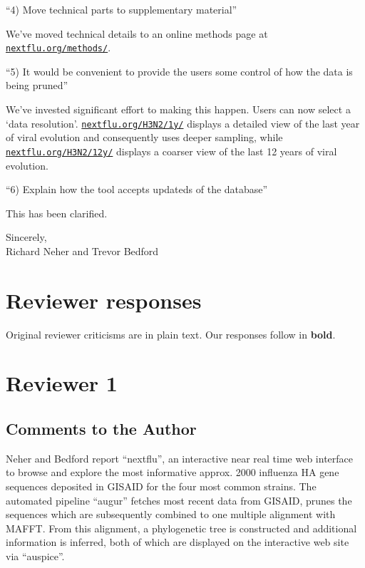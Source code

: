 \documentclass[11pt,oneside,letterpaper]{article}
\begin{document}
``4) Move technical parts to supplementary material''

We've moved technical details to an online methods page at \href{http://nextflu.org/methods/}{\texttt{nextflu.org/methods/}}.

``5) It would be convenient to provide the users some control of how the data is being pruned''

We've invested significant effort to making this happen. Users can now select a `data resolution'. \href{http://nextflu.org/H3N2/1y/}{\texttt{nextflu.org/H3N2/1y/}} displays a detailed view of the last year of viral evolution and consequently uses deeper sampling, while \href{http://nextflu.org/H3N2/12y/}{\texttt{nextflu.org/H3N2/12y/}} displays a coarser view of the last 12 years of viral evolution.

``6) Explain how the tool accepts updateds of the database''

This has been clarified.

Sincerely,\\
Richard Neher and Trevor Bedford

\restoregeometry

\newpage

\section*{Reviewer responses}

Original reviewer criticisms are in plain text.  Our responses follow in \textbf{bold}.  


\section*{Reviewer 1}

\subsection*{Comments to the Author}

Neher and Bedford report ``nextflu'', an interactive near real time web interface to browse and explore the most informative approx. 2000 influenza HA gene sequences deposited in GISAID for the four most common strains. The automated pipeline ``augur'' fetches most recent data from GISAID, prunes the sequences which are subsequently combined to one multiple alignment with MAFFT. From this alignment, a phylogenetic tree is constructed and additional information is inferred, both of which are displayed on the interactive web site via ``auspice''.
\end{document}
